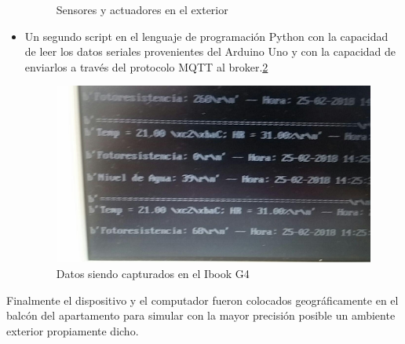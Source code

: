 \begin{itemize}
\begin{figure}[!htb]
\caption{Sensores y actuadores en el exterior}
\label{fig:sensores_ext}
\vspace*{-10pt}
\end{figure}



\item Un segundo script en el lenguaje de programación Python con la capacidad de leer los datos seriales provenientes del Arduino Uno y con la capacidad de enviarlos a través del protocolo MQTT al broker.\ref{fig:ibook_data}  
\begin{figure}[!htb]
\centering
\includegraphics[scale=0.22]{./Figuras/ibook_data.jpg}
\caption{Datos siendo capturados en el Ibook G4}
\label{fig:ibook_data}
\vspace*{-10pt}
\end{figure}

\end{itemize}
Finalmente el dispositivo y el computador fueron colocados geográficamente en el balcón del apartamento para simular con la mayor precisión posible un ambiente exterior propiamente dicho.\\

